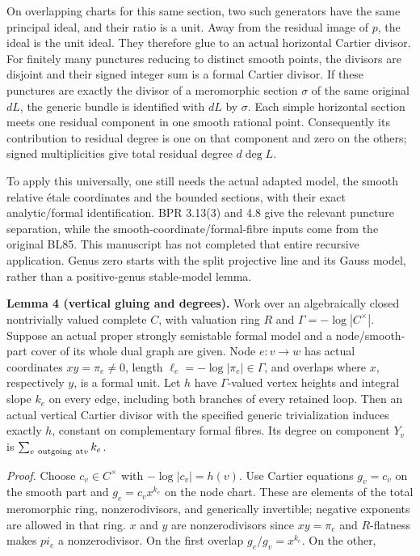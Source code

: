 \documentclass[
  11pt,
]{article}
\begin{document}
On overlapping charts for this same section, two such generators have
the same principal ideal, and their ratio is a unit. Away from the
residual image of \(p\), the ideal is the unit ideal. They therefore
glue to an actual horizontal Cartier divisor. For finitely many
punctures reducing to distinct smooth points, the divisors are disjoint
and their signed integer sum is a formal Cartier divisor. If these
punctures are exactly the divisor of a meromorphic section \(\sigma\) of
the same original \(dL\), the generic bundle is identified with \(dL\)
by \(\sigma\). Each simple horizontal section meets one residual
component in one smooth rational point. Consequently its contribution to
residual degree is one on that component and zero on the others; signed
multiplicities give total residual degree \(d\deg L\).

To apply this universally, one still needs the actual adapted model, the
smooth relative étale coordinates and the bounded sections, with their
exact analytic/formal identification. BPR 3.13(3) and 4.8 give the
relevant puncture separation, while the smooth-coordinate/formal-fibre
inputs come from the original BL85. This manuscript has not completed
that entire recursive application. Genus zero starts with the split
projective line and its Gauss model, rather than a positive-genus
stable-model lemma.

\textbf{Lemma 4 (vertical gluing and degrees).} Work over an
algebraically closed nontrivially valued complete \(C\), with valuation
ring \(R\) and \(\Gamma=-\log|C^\times|\). Suppose an actual proper
strongly semistable formal model and a node/smooth-part cover of its
whole dual graph are given. Node \(e:v\to w\) has actual coordinates
\(xy=\pi_e\ne0\), length \(\ell_e=-\log|\pi_e|\in\Gamma\), and overlaps
where \(x\), respectively \(y\), is a formal unit. Let \(h\) have
\(\Gamma\)-valued vertex heights and integral slope \(k_e\) on every
edge, including both branches of every retained loop. Then an actual
vertical Cartier divisor with the specified generic trivialization
induces exactly \(h\), constant on complementary formal fibres. Its
degree on component \(Y_v\) is \(\sum_{e\ {\rm outgoing\ at} v}k_e\).

\emph{Proof.} Choose \(c_v\in C^\times\) with \(-\log|c_v|=h(v)\). Use
Cartier equations \(g_v=c_v\) on the smooth part and \(g_e=c_vx^{k_e}\)
on the node chart. These are elements of the total meromorphic ring,
nonzerodivisors, and generically invertible; negative exponents are
allowed in that ring. \(x\) and \(y\) are nonzerodivisors since
\(xy=\pi_e\) and \(R\)-flatness makes \(pi_e\) a nonzerodivisor. On the
first overlap \(g_e/g_v=x^{k_e}\). On the other,
\end{document}
